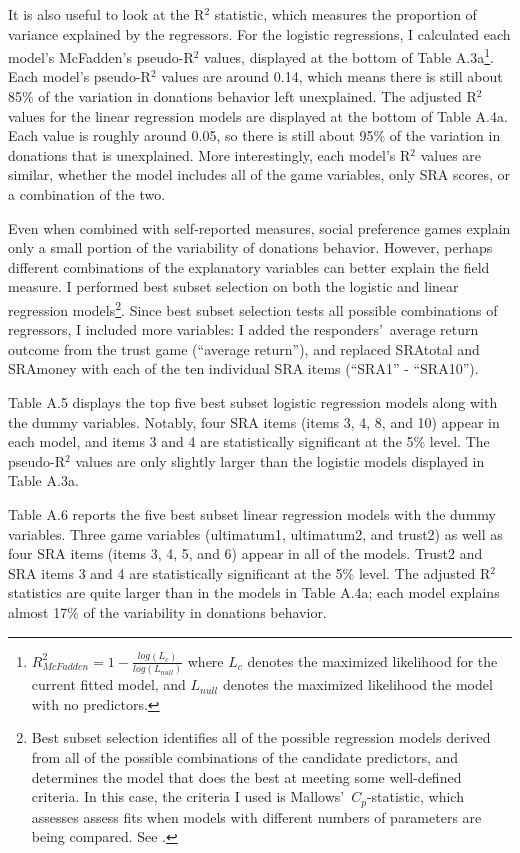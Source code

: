 \documentclass[12pt]{article}
\begin{document}
It is also useful to look at the R$^{2}$ statistic, which measures the proportion of variance explained by the regressors. For the logistic regressions, I calculated each model\rq s McFadden\rq s pseudo-R$^{2}$ values, displayed at the bottom of Table A.3a\footnote{
\(R^{2}_{McFadden} = 1 - \frac{log(L_{c})}{log(L_{null})}\)
where \(L_{c}\) denotes the maximized likelihood for the current fitted model, and \(L_{null}\) denotes the maximized likelihood the model with no predictors.
}. Each model\rq s pseudo-R$^{2}$ values are around 0.14, which means there is still about 85\% of the variation in donations behavior left unexplained. The adjusted R$^{2}$ values for the linear regression models are displayed at the bottom of Table A.4a. Each value is roughly around 0.05, so there is still about 95\% of the variation in donations that is unexplained. More interestingly, each model\rq s R$^{2}$ values are similar, whether the model includes all of the game variables, only SRA scores, or a combination of the two.

Even when combined with self-reported measures, social preference games explain only a small portion of the variability of donations behavior. However, perhaps different combinations of the explanatory variables can better explain the field measure. I performed best subset selection on both the logistic and linear regression models\footnote{Best subset selection identifies all of the possible regression models derived from all of the possible combinations of the candidate predictors, and determines the model that does the best at meeting some well-defined criteria. In this case, the criteria I used is Mallows\rq \ \(C_{p}\)-statistic, which assesses assess fits when models with different numbers of parameters are being compared.  See \cite{mallows_1973}.}. Since best subset selection tests all possible combinations of regressors, I included more variables: I added the responders\rq \ average return outcome from the trust game (``average return''), and replaced SRAtotal and SRAmoney with each of the ten individual SRA items (``SRA1'' - ``SRA10''). 

Table A.5 displays the top five best subset logistic regression models along with the dummy variables. Notably, four SRA items (items 3, 4, 8, and 10) appear in each model, and items 3 and 4 are statistically significant at the 5\% level. The pseudo-R$^{2}$ values are only slightly larger than the logistic models displayed in Table A.3a.

Table A.6 reports the five best subset linear regression models with the dummy variables. Three game variables (ultimatum1, ultimatum2, and trust2) as well as four SRA items (items 3, 4, 5, and 6) appear in all of the models. Trust2 and SRA items 3 and 4 are statistically significant at the 5\% level. The adjusted R$^{2}$ statistics are quite larger than in the models in Table A.4a; each model explains almost 17\% of the variability in donations behavior. 
\end{document}
